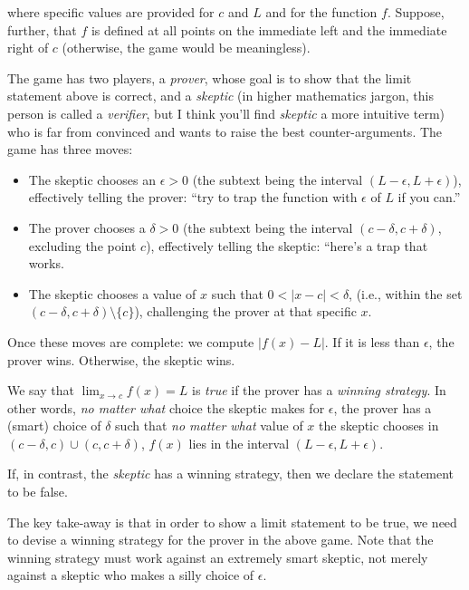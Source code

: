 \documentclass[10pt]{amsart}
\begin{document}
where specific values are provided for $c$ and $L$ and for the
function $f$. Suppose, further, that $f$ is defined at all points on
the immediate left and the immediate right of $c$ (otherwise, the game
would be meaningless).

The game has two players, a {\em prover}, whose goal is to show that
the limit statement above is correct, and a {\em skeptic} (in higher
mathematics jargon, this person is called a {\em verifier}, but I
think you'll find {\em skeptic} a more intuitive term) who is far from
convinced and wants to raise the best counter-arguments. The game has
three moves:

\begin{itemize}
\item The skeptic chooses an $\epsilon > 0$ (the subtext being the
  interval $(L - \epsilon, L + \epsilon)$), effectively telling the
  prover: ``try to trap the function with $\epsilon$ of $L$ if you
  can.''
\item The prover chooses a $\delta > 0$ (the subtext being the
  interval $(c - \delta,c + \delta)$, excluding the point $c$),
  effectively telling the skeptic: ``here's a trap that works.
\item The skeptic chooses a value of $x$ such that $0 < |x - c| <
  \delta$, (i.e., within the set $(c - \delta, c + \delta) \setminus
  \{ c \}$), challenging the prover at that specific $x$.
\end{itemize}

Once these moves are complete: we compute $|f(x) - L|$. If it is less
than $\epsilon$, the prover wins. Otherwise, the skeptic wins.

We say that $\lim_{x \to c} f(x) = L$ is {\em true} if the prover has
a {\em winning strategy}. In other words, {\em no matter what} choice
the skeptic makes for $\epsilon$, the prover has a (smart) choice of
$\delta$ such that {\em no matter what} value of $x$ the skeptic
chooses in $(c- \delta, c) \cup (c, c + \delta)$, $f(x)$ lies in the
interval $(L - \epsilon,L + \epsilon)$.

If, in contrast, the {\em skeptic} has a winning strategy, then we
declare the statement to be false.

The key take-away is that in order to show a limit statement to be
true, we need to devise a winning strategy for the prover in the above
game. Note that the winning strategy must work against an extremely
smart skeptic, not merely against a skeptic who makes a silly choice
of $\epsilon$.
\end{document}
